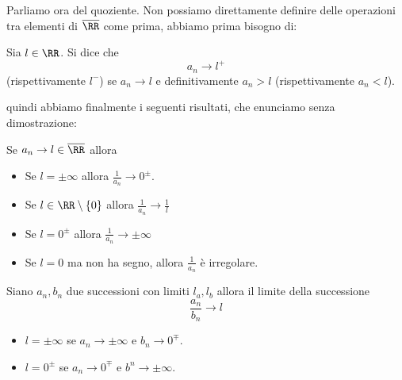 \documentclass[11pt]{scrartcl}
\begin{document}
	Parliamo ora del quoziente. Non possiamo direttamente definire delle operazioni tra elementi di $\overline{\RR}$ come prima, abbiamo prima bisogno di:
	\begin{definition}
		Sia $l\in\RR$. Si dice che 
		$$a_n\to l^+$$
		(rispettivamente $l^-$) se $a_n\to l$ e definitivamente $a_n> l$ (rispettivamente $a_n<l$).
	\end{definition}
	quindi abbiamo finalmente i seguenti risultati, che enunciamo senza dimostrazione:
	\begin{proposition}
		Se $a_n\to l\in\overline{\RR}$ allora 
		\begin{itemize}
			\item Se $l=\pm\infty$ allora $\frac{1}{a_n}\to 0^{\pm}$.
			\item Se $l\in\RR\setminus\left\{0\right\}$ allora $\frac{1}{a_n}\to\frac{1}{l}$
			\item Se $l=0^\pm$ allora $\frac{1}{a_n}\to \pm\infty$ 
			\item Se $l=0$ ma non ha segno, allora $\frac{1}{a_n}$ è irregolare.
		\end{itemize} 
	\end{proposition}
	\begin{proposition}
		Siano $a_n,b_n$ due successioni con limiti $l_a,l_b$ allora il limite della successione 
		$$\frac{a_n}{b_n}\to l$$
		\begin{itemize}
			\item $l=\pm\infty$ se $a_n\to \pm\infty$ e $b_n\to 0^\mp$.
			\item $l=0^\pm$ se $a_n\to 0^\mp$ e $b^n\to \pm\infty$.
		\end{itemize}
	\end{proposition}
\end{document}
